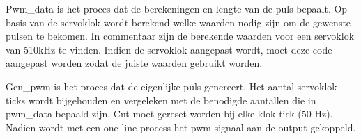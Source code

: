 
Pwm\_data is het proces dat de berekeningen en lengte van de puls bepaalt. Op basis van de servoklok wordt berekend welke waarden nodig zijn om de gewenste pulsen te bekomen. In commentaar zijn de berekende waarden voor een servoklok van 510kHz te vinden. Indien de servoklok aangepast wordt, moet deze code aangepast worden zodat de juiste waarden gebruikt worden.


Gen\_pwm is het proces dat de eigenlijke puls genereert. Het aantal servoklok ticks wordt bijgehouden en vergeleken met de benodigde aantallen die in pwm\_data bepaald zijn. Cnt moet gereset worden bij elke klok tick (50 Hz).\\
Nadien wordt met een one-line process het pwm signaal aan de output gekoppeld. \label{one-liner}

